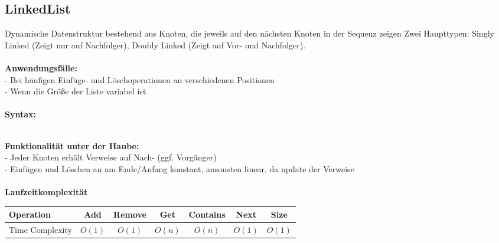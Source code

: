 \documentclass[../main.tex]{subfiles}
\begin{document}
		\subsection{LinkedList}
		Dynamische Datenstruktur bestehend aus Knoten, die jeweils auf den nächsten Knoten in der Sequenz zeigen
		Zwei Haupttypen: Singly Linked (Zeigt nur auf Nachfolger), Doubly Linked (Zeigt  auf Vor- und Nachfolger).\\\\
		\textbf{Anwendungsfälle:}\\
		- Bei häufigen Einfüge- und Löschoperationen an verschiedenen Positionen\\
		- Wenn die Größe der Liste variabel ist\\\\
		\textbf{Syntax:}
		 
		\\
		\textbf{Funktionalität unter der Haube:}\\
		- Jeder Knoten erhält Verweise auf Nach- (ggf. Vorgänger)\\
		- Einfügen und Löschen an am Ende/Anfang konstant, ansonsten linear, da update der Verweise\\\\
		\textbf{Laufzeitkomplexität}\\
		\begin{table}[ht]
			\centering
			\begin{tabular}{l *{6}{c}}
				\toprule
				Operation & Add & Remove & Get & Contains & Next & Size \\
				\midrule
				Time Complexity & $O(1)$ & $O(1)$ & $O(n)$ & $O(n)$ & $O(1)$ & $O(1)$ \\
				\bottomrule
			\end{tabular}
		\end{table}
	\clearpage
		
		
\end{document}
